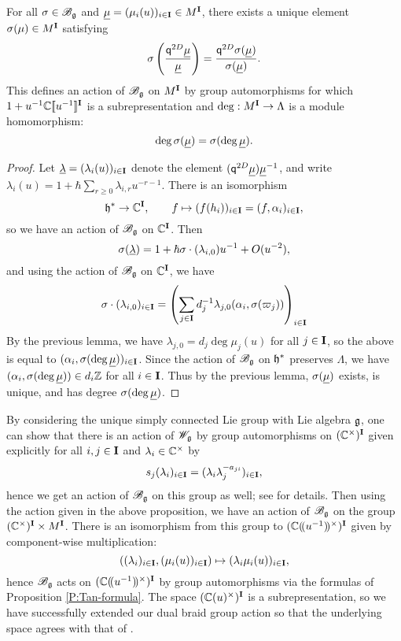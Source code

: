 \begin{proposition}\label{P:Bg-action-M}
    For all $\sigma\in\mathscr{B}_{\mathfrak{g}}$ and $\underline{\mu} = (\mu_i(u))_{i\in\mathbf{I}} \in M^{\mathbf{I}}$, there exists a unique element $\sigma(\mu)\in M^{\mathbf{I}}$ satisfying
    \[\sigma\left(\frac{\mathsf{q}^{2D}\underline{\mu}}{\underline{\mu}}\right) = \frac{\mathsf{q}^{2D}\sigma(\underline{\mu})}{\sigma(\underline{\mu})}.\]
    This defines an action of $\mathscr{B}_{\mathfrak{g}}$ on $M^{\mathbf{I}}$ by group automorphisms for which $1+u^{-1}\mathbb{C}[\![u^{-1}]\!]^{\mathbf{I}}$ is a subrepresentation and $\deg:M^{\mathbf{I}}\to\Lambda$ is a module homomorphism:
    \[\deg\sigma(\underline{\mu}) = \sigma(\deg\underline{\mu}).\]
\end{proposition}
\begin{proof}
    Let $\underline{\lambda} = (\lambda_i(u))_{i\in\mathbf{I}}$ denote the element $(\mathsf{q}^{2D}\underline{\mu})\underline{\mu}^{-1}$, and write $\lambda_i(u) = 1+\hbar\sum_{r\geq 0}\lambda_{i,r}u^{-r-1}$.
    There is an isomorphism
    \[\mathfrak{h}^*\to\mathbb{C}^{\mathbf{I}}, \qquad f\mapsto (f(h_i))_{i\in\mathbf{I}} = (f, \alpha_i)_{i\in\mathbf{I}},\]
    so we have an action of $\mathscr{B}_{\mathfrak{g}}$ on $\mathbb{C}^{\mathbf{I}}$.
    Then
    \[\sigma(\underline{\lambda}) = 1 + \hbar\sigma\cdot(\lambda_{i,0})u^{-1} + O(u^{-2}),\]
    and using the action of $\mathscr{B}_{\mathfrak{g}}$ on $\mathbb{C}^{\mathbf{I}}$, we have
    \[\sigma\cdot(\lambda_{i,0})_{i\in\mathbf{I}} = \left(\sum_{j\in\mathbf{I}}d_j^{-1}\lambda_{j,0}(\alpha_i,\sigma(\varpi_j))\right)_{i\in\mathbf{I}}\]
    By the previous lemma, we have $\lambda_{j,0} = d_j\deg\mu_j(u)$ for all $j\in\mathbf{I}$, so the above is equal to $(\alpha_i,\sigma(\deg\underline{\mu}))_{i\in\mathbf{I}}$.
    Since the action of $\mathscr{B}_{\mathfrak{g}}$ on $\mathfrak{h}^*$ preserves $\Lambda$, we have $(\alpha_i,\sigma(\deg\underline{\mu}))\in d_i\mathbb{Z}$ for all $i\in\mathbf{I}$.
    Thus by the previous lemma, $\sigma(\underline{\mu})$ exists, is unique, and has degree $\sigma(\deg\underline{\mu})$.
\end{proof}

By considering the unique simply connected Lie group with Lie algebra $\mathfrak{g}$, one can show that there is an action of $\mathscr{W}_{\mathfrak{g}}$ by group automorphisms on $(\mathbb{C}^\times)^{\mathbf{I}}$ given explicitly for all $i,j\in\mathbf{I}$ and $\lambda_i\in\mathbb{C}^\times$ by
\[s_j(\lambda_i)_{i\in\mathbf{I}} = (\lambda_i\lambda_j^{-a_{ji}})_{i\in\mathbf{I}},\]
hence we get an action of $\mathscr{B}_{\mathfrak{g}}$ on this group as well; see \cite[Remark 4.5]{friesen_braid_2024} for details.
Then using the action given in the above proposition, we have an action of $\mathscr{B}_{\mathfrak{g}}$ on the group $(\mathbb{C}^\times)^{\mathbf{I}}\times M^{\mathbf{I}}$.
There is an isomorphism from this group to $(\mathbb{C}(\!(u^{-1})\!)^\times)^{\mathbf{I}}$ given by component-wise multiplication:
\[((\lambda_i)_{i\in\mathbf{I}}, (\mu_i(u))_{i\in\mathbf{I}}) \mapsto (\lambda_i\mu_i(u))_{i\in\mathbf{I}},\]
hence $\mathscr{B}_{\mathfrak{g}}$ acts on $(\mathbb{C}(\!(u^{-1})\!)^\times)^{\mathbf{I}}$ by group automorphisms via the formulas of Proposition \ref{P:Tan-formula}.
The space $(\mathbb{C}(u)^\times)^{\mathbf{I}}$ is a subrepresentation, so we have successfully extended our dual braid group action so that the underlying space agrees with that of \cite[Prop. 3.1]{tan_braid_2015}.


